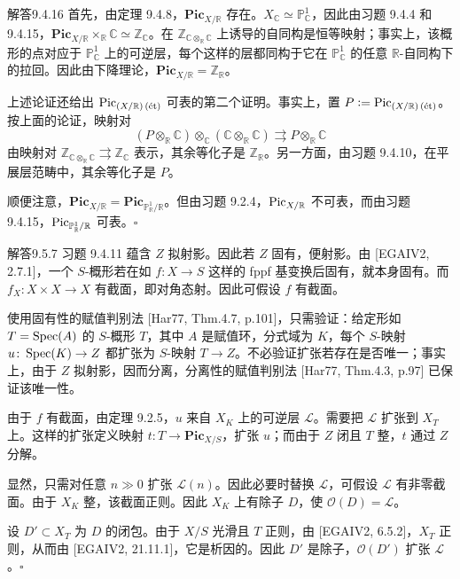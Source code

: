 \begin{origstatement}{解答}{9.4.16}\label{appA:ans9416}
首先，由定理 9.4.8，$\mathbf{Pic}_{X/\mathbb R}$ 存在。$X_{\mathbb C}\simeq\mathbb P_{\mathbb C}^1$，因此由习题 9.4.4 和 9.4.15，$\mathbf{Pic}_{X/\mathbb R}\times_{\mathbb R}\mathbb C\simeq\mathbb Z_{\mathbb C}$。在 $\mathbb Z_{\mathbb C\otimes_{\mathbb R}\mathbb C}$ 上诱导的自同构是恒等映射；事实上，该概形的点对应于 $\mathbb P_{\mathbb C}^1$ 上的可逆层，每个这样的层都同构于它在 $\mathbb P_{\mathbb C}^1$ 的任意 $\mathbb R$-自同构下的拉回。因此由下降理论，$\mathbf{Pic}_{X/\mathbb R}=\mathbb Z_{\mathbb R}$。

上述论证还给出 $\operatorname{Pic}_{(X/\mathbb R)\,(\text{ét})}$ 可表的第二个证明。事实上，置 $P\mathrel{\mathop:}=\operatorname{Pic}_{(X/\mathbb R)\,(\text{ét})}$。按上面的论证，映射对
\[
 (P\otimes_{\mathbb R}\mathbb C)\otimes_{\mathbb C}(\mathbb C\otimes_{\mathbb R}\mathbb C)
 \rightrightarrows P\otimes_{\mathbb R}\mathbb C
\]
由映射对 $\mathbb Z_{\mathbb C\otimes_{\mathbb R}\mathbb C}\rightrightarrows\mathbb Z_{\mathbb C}$ 表示，其余等化子是 $\mathbb Z_{\mathbb R}$。另一方面，由习题 9.4.10，在平展层范畴中，其余等化子是 $P$。

顺便注意，$\mathbf{Pic}_{X/\mathbb R}=\mathbf{Pic}_{\mathbb P_{\mathbb R}^1/\mathbb R}$。但由习题 9.2.4，$\operatorname{Pic}_{X/\mathbb R}$ 不可表，而由习题 9.4.15，$\operatorname{Pic}_{\mathbb P_{\mathbb R}^1/\mathbb R}$ 可表。\hfill$\square$
\end{origstatement}

\begin{origstatement}{解答}{9.5.7}\label{appA:ans957}
习题 9.4.11 蕴含 $Z$ 拟射影。因此若 $Z$ 固有，便射影。由 [EGAIV2, 2.7.1]，一个 $S$-概形若在如 $f\colon X\to S$ 这样的 fppf 基变换后固有，就本身固有。而 $f_X\colon X\times X\to X$ 有截面，即对角态射。因此可假设 $f$ 有截面。

使用固有性的赋值判别法 [Har77, Thm.4.7, p.101]，只需验证：给定形如 $T=\operatorname{Spec}(A)$ 的 $S$-概形 $T$，其中 $A$ 是赋值环，分式域为 $K$，每个 $S$-映射 $u\colon\operatorname{Spec}(K)\to Z$ 都扩张为 $S$-映射 $T\to Z$。不必验证扩张若存在是否唯一；事实上，由于 $Z$ 拟射影，因而分离，分离性的赋值判别法 [Har77, Thm.4.3, p.97] 已保证该唯一性。

由于 $f$ 有截面，由定理 9.2.5，$u$ 来自 $X_K$ 上的可逆层 $\mathcal L$。需要把 $\mathcal L$ 扩张到 $X_T$ 上。这样的扩张定义映射 $t\colon T\to\mathbf{Pic}_{X/S}$，扩张 $u$；而由于 $Z$ 闭且 $T$ 整，$t$ 通过 $Z$ 分解。

显然，只需对任意 $n\gg0$ 扩张 $\mathcal L(n)$。因此必要时替换 $\mathcal L$，可假设 $\mathcal L$ 有非零截面。由于 $X_K$ 整，该截面正则。因此 $X_K$ 上有除子 $D$，使 $\mathcal O(D)=\mathcal L$。

设 $D'\subset X_T$ 为 $D$ 的闭包。由于 $X/S$ 光滑且 $T$ 正则，由 [EGAIV2, 6.5.2]，$X_T$ 正则，从而由 [EGAIV2, 21.11.1]，它是析因的。因此 $D'$ 是除子，$\mathcal O(D')$ 扩张 $\mathcal L$。\hfill$\square$
\end{origstatement}

